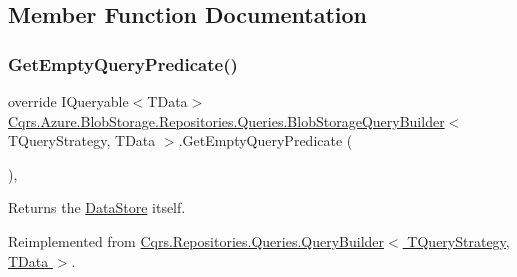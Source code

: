 \subsection{Member Function Documentation}
\mbox{\label{classCqrs_1_1Azure_1_1BlobStorage_1_1Repositories_1_1Queries_1_1BlobStorageQueryBuilder_a5987844de032c5473714dafcee7f4ae1_a5987844de032c5473714dafcee7f4ae1}} 
\subsubsection{\texorpdfstring{Get\+Empty\+Query\+Predicate()}{GetEmptyQueryPredicate()}}
{\footnotesize\ttfamily override I\+Queryable$<$T\+Data$>$ \hyperlink{classCqrs_1_1Azure_1_1BlobStorage_1_1Repositories_1_1Queries_1_1BlobStorageQueryBuilder}{Cqrs.\+Azure.\+Blob\+Storage.\+Repositories.\+Queries.\+Blob\+Storage\+Query\+Builder}$<$ T\+Query\+Strategy, T\+Data $>$.Get\+Empty\+Query\+Predicate (\begin{DoxyParamCaption}{ }\end{DoxyParamCaption})\hspace{0.3cm}{\ttfamily [protected]}, {\ttfamily [virtual]}}



Returns the \hyperlink{classCqrs_1_1Repositories_1_1Queries_1_1QueryBuilder_a8a64851b3bf82ed5d2e708cd39d71890_a8a64851b3bf82ed5d2e708cd39d71890}{Data\+Store} itself. 



Reimplemented from \hyperlink{classCqrs_1_1Repositories_1_1Queries_1_1QueryBuilder_a7dc8f0da3bb4ef54b8cbdda6c50ee0a1_a7dc8f0da3bb4ef54b8cbdda6c50ee0a1}{Cqrs.\+Repositories.\+Queries.\+Query\+Builder$<$ T\+Query\+Strategy, T\+Data $>$}.

